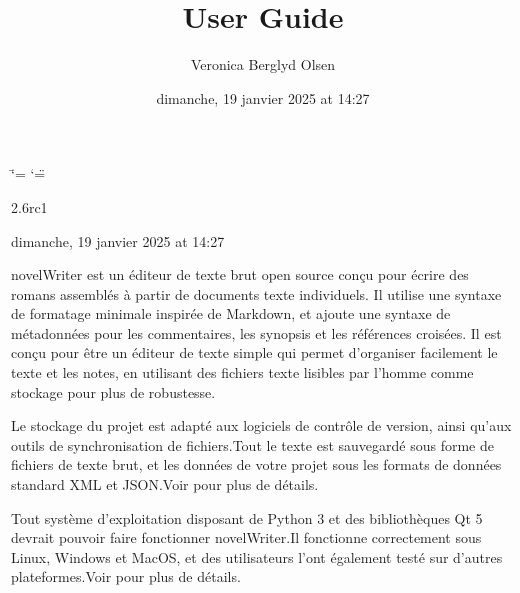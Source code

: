 \documentclass[a4paper,11pt,french]{sphinxmanual}
\title{User Guide}
\date{dimanche, 19 janvier 2025 at 14:27}
\author{Veronica Berglyd Olsen}
\let\sphinxpxdimen\pdfpxdimen\else\newdimen\sphinxpxdimen
\begin{document}
\ifdefined\shorthandoff
  \ifnum\catcode`\=\string=\active\shorthandoff{=}\fi
  \ifnum\catcode`\"=\active{}\fi
\fi

\pagestyle{empty}
\sphinxmaketitle
\pagestyle{plain}
\sphinxtableofcontents
\pagestyle{normal}
\label{\detokenize{index::doc}}


\begin{DUlineblock}{0em}
\item[]  2.6rc1
\item[]  dimanche, 19 janvier 2025 at 14:27
\end{DUlineblock}

\sphinxAtStartPar
novelWriter est un éditeur de texte brut open source conçu pour écrire des romans assemblés à partir de documents texte individuels. Il utilise une syntaxe de formatage minimale inspirée de Markdown, et ajoute une syntaxe de métadonnées pour les commentaires, les synopsis et les références croisées. Il est conçu pour être un éditeur de texte simple qui permet d’organiser facilement le texte et les notes, en utilisant des fichiers texte lisibles par l’homme comme stockage pour plus de robustesse.

\begin{figure}[htbp]
\centering

\noindent\sphinxincludegraphics[width=500\sphinxpxdimen]{{screenshot_multi}.png}
\end{figure}

\sphinxAtStartPar
Le stockage du projet est adapté aux logiciels de contrôle de version, ainsi qu’aux outils de synchronisation de fichiers.Tout le texte est sauvegardé sous forme de fichiers de texte brut, et les données de votre projet sous les formats de données standard XML et JSON.Voir {\hyperref[\detokenize{tech_storage:a-storage}]{}} pour plus de détails.

\sphinxAtStartPar
Tout système d’exploitation disposant de Python 3 et des bibliothèques Qt 5 devrait pouvoir faire fonctionner novelWriter.Il fonctionne correctement sous Linux, Windows et MacOS, et des utilisateurs l’ont également testé sur d’autres plateformes.Voir {\hyperref[\detokenize{int_started:a-started}]{}} pour plus de détails.
\end{document}

